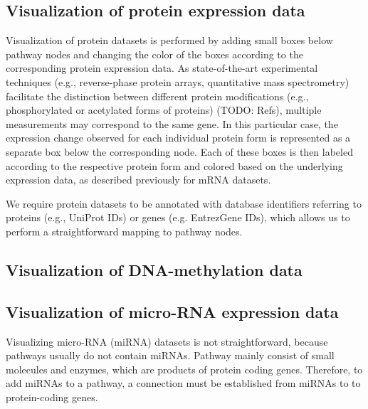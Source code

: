 \documentclass{bioinfo}
\begin{document}
\subsection{Visualization of protein expression data}

Visualization of protein datasets is performed by adding small boxes below pathway nodes and
changing the color of the boxes according to the corresponding protein expression data. As state-of-the-art 
experimental techniques (e.g., reverse-phase protein arrays, quantitative mass spectrometry) 
facilitate the distinction between different protein modifications (e.g., phosphorylated or 
acetylated forms of proteins) (TODO: Refs), multiple measurements may correspond to the same gene. 
In this particular case, the expression change observed for each individual protein form is represented 
as a separate box below the corresponding node. Each of these boxes is then labeled according to the 
respective protein form and colored based on the underlying expression data, as described previously 
for mRNA datasets.

We require protein datasets to be annotated with database identifiers referring to proteins (e.g.,
UniProt IDs) or genes (e.g. EntrezGene IDs), which allows us to perform a straightforward mapping to
pathway nodes.

\subsection{Visualization of DNA-methylation data}






\subsection{Visualization of micro-RNA expression data}

Visualizing micro-RNA (miRNA) datasets is not straightforward, because pathways usually do not
contain miRNAs. Pathway mainly consist of small molecules and enzymes, which are products of protein
coding genes. Therefore, to add miRNAs to a pathway, a connection must be established from miRNAs to
to protein-coding genes.
\end{document}
